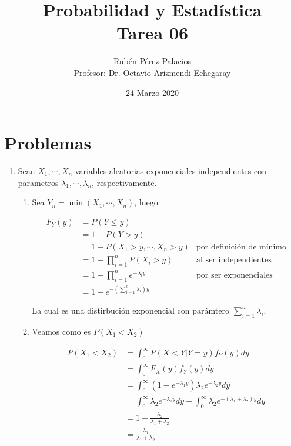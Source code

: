 \documentclass[letterpaper]{article}
\title{Probabilidad y Estadística\\Tarea 06}
\author{Rubén Pérez Palacios\\Profesor: Dr. Octavio Arizmendi Echegaray}
\date{24 Marzo 2020}
\theoremstyle{definition}
\theoremstyle{lemathm}
\theoremstyle{lemademthm}
\begin{document}
	\maketitle
    
	\section*{Problemas}

    \begin{enumerate}
        
        \item Sean $X_1, \cdots, X_n$ variables aleatorias exponenciales independientes con parametros \linebreak $\lambda_1, \cdots, \lambda_n$, respectivamente.
		
		\begin{enumerate}
			\item Sea $Y_n = \min(X_1,\cdots,X_n)$, luego
			
			\begin{align*}
				F_Y(y) &= P(Y \leq y)\\
				&= 1 - P(Y > y)\\
				&= 1 - P(X_1 > y, \cdots, X_n > y) & \text{por definición de mínimo}\\
				&= 1 - \prod_{i=1}^n P(X_i > y) & \text{al ser independientes}\\
				&= 1 - \prod_{i=1}^n e^{-\lambda_i y} & \text{por ser exponenciales}\\
				&= 1 - e^{-\left(\sum_{i=1}^n \lambda_i\right) y}
			\end{align*}

			La cual es una distirbución exponencial con parámtero $\sum_{i=1}^n \lambda_i$.

			\item Veamos como es $P(X_1 < X_2)$
			
			\begin{align*}
				P(X_1 < X_2) &= \int_0^\infty P(X < Y | Y = y) f_Y(y) dy\\
				&= \int_0^\infty F_X(y) f_Y(y) dy\\
				&= \int_0^\infty (1 - e^{-\lambda_1 y}) \lambda_2 e^{-\lambda_2 y} dy\\
				&= \int_0^\infty \lambda_2 e^{-\lambda_2 y} dy - \int_0^\infty \lambda_2 e^{-(\lambda_1 + \lambda_2) y} dy\\
				&= 1 - \frac{\lambda_2}{\lambda_1 + \lambda_2}\\
				&= \frac{\lambda_1}{\lambda_1 + \lambda_2}
			\end{align*}


\end{enumerate}
\end{enumerate}
\end{document}
